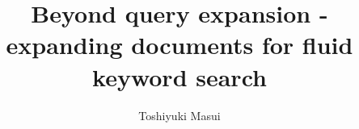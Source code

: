\documentclass[manuscript,screen,review]{acmart}
\begin{document}
\title{Beyond query expansion - expanding documents for fluid keyword search}

\author{Toshiyuki Masui}

\renewcommand{\shortauthors}{Toshiyuki Masui}
\end{document}
